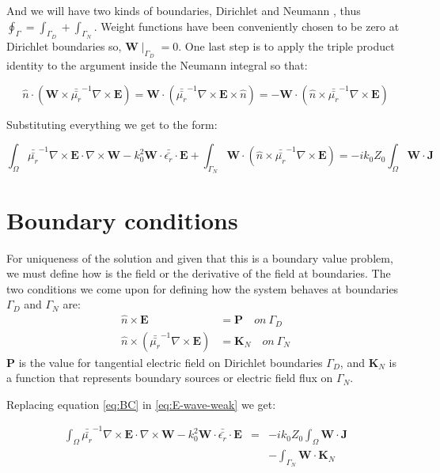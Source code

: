 And we will have two kinds of boundaries, Dirichlet and Neumann \cite{Garcia2011}, thus $\oint_{\Gamma} = \int_{\Gamma_D}+\int_{\Gamma_N}$. Weight functions have been conveniently chosen to be zero at Dirichlet boundaries so, $\mathbf{W}\mid_{\Gamma_D}=0$. 
One last step is to apply the triple product identity to the argument inside the Neumann integral so that:

$$\hat{n}\cdot
\left(\mathbf{W}\times\bar{\bar{\mu_r}}^{-1}
\nabla\times\mathbf{E}\right) =\mathbf{W} \cdot
 \left(\bar{\bar{\mu_r}}^{-1}
\nabla\times\mathbf{E}\times\hat{n}\right) = -\mathbf{W} \cdot
 \left(\hat{n}\times\bar{\bar{\mu_r}}^{-1}
\nabla\times\mathbf{E}\right)$$

Substituting everything we get to the form:

\begin{equation}
\int_{\Omega} \bar{\bar{\mu_r}}^{-1}\nabla\times \mathbf{E}\cdot \nabla\times\mathbf{W}
-k_0^{2}\mathbf{W}\cdot \bar{\bar{\epsilon_r}}\cdot \mathbf{E}
+ \int_{\Gamma_N} \mathbf{W} \cdot
 \left(\hat{n}\times\bar{\bar{\mu_r}}^{-1}
\nabla\times\mathbf{E}\right)
= -ik_0Z_0 \int_{\Omega} \mathbf{W}\cdot\mathbf{J} \label{eq:E-wave-weak} 
\end{equation}


\section{Boundary conditions}

For uniqueness of the solution and given that this is a boundary value problem, we must define how is the field or the derivative of the field at boundaries. The two conditions we come upon for defining how the system behaves at boundaries $\Gamma_D$ and $\Gamma_N$ are:
\begin{align}
\hat{n}\times\mathbf{E}&=\mathbf{P} \quad on \ \Gamma_D\\
\hat{n}\times\left(\bar{\bar{\mu_r}}^{-1}
\nabla\times \mathbf{E}\right) &=\mathbf{K}_N \quad on \ \Gamma_N \label{eq:BC}
\end{align}
$\mathbf{P}$ is the value for tangential electric field on Dirichlet boundaries $\Gamma_D$,  and $\mathbf{K}_N$ is a function that represents boundary sources or electric field flux on $\Gamma_N$.

Replacing equation \ref{eq:BC} in \ref{eq:E-wave-weak} we get:

\begin{equation}
\begin{array}{rcl}
\int_{\Omega} \bar{\bar{\mu_r}}^{-1}\nabla\times \mathbf{E}\cdot \nabla\times\mathbf{W}
-k_0^{2}\mathbf{W}\cdot \bar{\bar{\epsilon_r}}\cdot \mathbf{E}
&=& -ik_0Z_0 \int_{\Omega} \mathbf{W}\cdot\mathbf{J} \label{eq:E-wave-weak_3} \\
&&- \int_{\Gamma_N} \mathbf{W} \cdot\mathbf{K}_N 
\end{array}
\end{equation}

